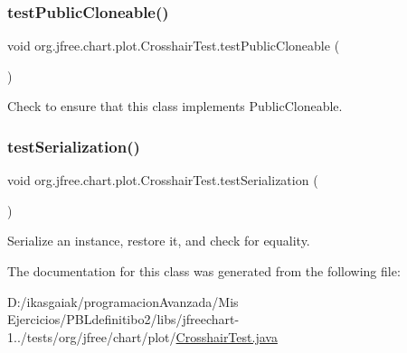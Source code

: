 \subsubsection{\texorpdfstring{test\+Public\+Cloneable()}{testPublicCloneable()}}
{\footnotesize\ttfamily void org.\+jfree.\+chart.\+plot.\+Crosshair\+Test.\+test\+Public\+Cloneable (\begin{DoxyParamCaption}{ }\end{DoxyParamCaption})}

Check to ensure that this class implements Public\+Cloneable. \mbox{\label{classorg_1_1jfree_1_1chart_1_1plot_1_1_crosshair_test_aa229fbb9d51bfe6057292f36ec997e7c}} 
\subsubsection{\texorpdfstring{test\+Serialization()}{testSerialization()}}
{\footnotesize\ttfamily void org.\+jfree.\+chart.\+plot.\+Crosshair\+Test.\+test\+Serialization (\begin{DoxyParamCaption}{ }\end{DoxyParamCaption})}

Serialize an instance, restore it, and check for equality. 

The documentation for this class was generated from the following file\+:\begin{DoxyCompactItemize}
\item 
D\+:/ikasgaiak/programacion\+Avanzada/\+Mis Ejercicios/\+P\+B\+Ldefinitibo2/libs/jfreechart-\/1../tests/org/jfree/chart/plot/\mbox{\hyperlink{_crosshair_test_8java}{Crosshair\+Test.\+java}}\end{DoxyCompactItemize}
